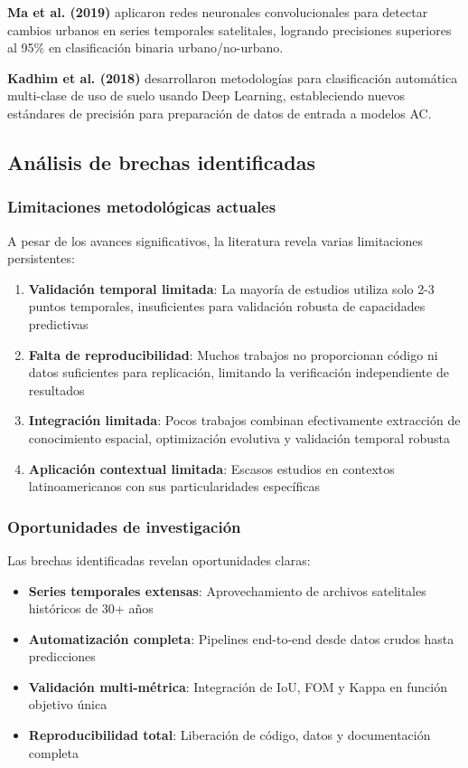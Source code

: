 \textbf{Ma et al. (2019)} aplicaron redes neuronales convolucionales para detectar cambios urbanos en series temporales satelitales, logrando precisiones superiores al 95\% en clasificación binaria urbano/no-urbano.

\textbf{Kadhim et al. (2018)} desarrollaron metodologías para clasificación automática multi-clase de uso de suelo usando Deep Learning, estableciendo nuevos estándares de precisión para preparación de datos de entrada a modelos AC.

\subsection{Análisis de brechas identificadas}

\subsubsection{Limitaciones metodológicas actuales}

A pesar de los avances significativos, la literatura revela varias limitaciones persistentes:

\begin{enumerate}
	\item \textbf{Validación temporal limitada}: La mayoría de estudios utiliza solo 2-3 puntos temporales, insuficientes para validación robusta de capacidades predictivas

	\item \textbf{Falta de reproducibilidad}: Muchos trabajos no proporcionan código ni datos suficientes para replicación, limitando la verificación independiente de resultados

	\item \textbf{Integración limitada}: Pocos trabajos combinan efectivamente extracción de conocimiento espacial, optimización evolutiva y validación temporal robusta

	\item \textbf{Aplicación contextual limitada}: Escasos estudios en contextos latinoamericanos con sus particularidades específicas
\end{enumerate}

\subsubsection{Oportunidades de investigación}

Las brechas identificadas revelan oportunidades claras:

\begin{itemize}
	\item \textbf{Series temporales extensas}: Aprovechamiento de archivos satelitales históricos de 30+ años
	\item \textbf{Automatización completa}: Pipelines end-to-end desde datos crudos hasta predicciones
	\item \textbf{Validación multi-métrica}: Integración de IoU, FOM y Kappa en función objetivo única
	\item \textbf{Reproducibilidad total}: Liberación de código, datos y documentación completa
\end{itemize}

